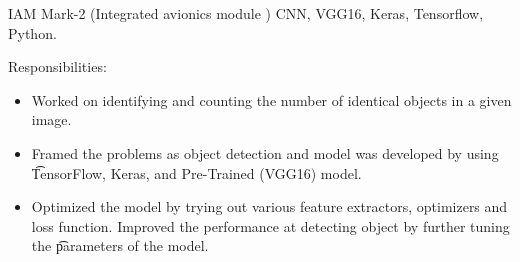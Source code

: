 \renewcommand{\baselinestretch}{1.3}

\begin{keywords}
		{IAM Mark-2 (Integrated avionics module )
  }
		{CNN, VGG16, Keras, Tensorflow, Python.}
\end{keywords}
\begin{experiences}
  \experience
    { }   {Responsibilities:}{}{}
    {} {
                      \begin{itemize}
                        \item Worked on identifying and counting the number of identical objects in a given image.
                          
                        \item Framed the problems as object detection and model was developed by using  \t TensorFlow, Keras, and Pre-Trained (VGG16) model.                    
                        \item Optimized the model by trying out various feature extractors, optimizers and loss function. Improved the  performance at detecting object by further tuning the \t parameters of the model.
                        
                        
                        
                        
                        
                      \end{itemize}
                    }


\end{experiences}

